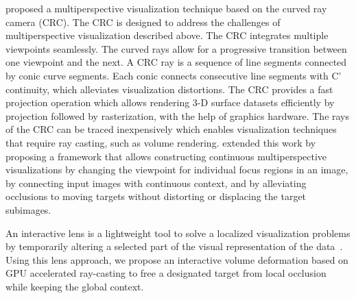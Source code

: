 \cite{5613463} proposed a multiperspective visualization technique
based on the curved ray camera (CRC). The CRC is designed to
address the challenges of multiperspective visualization described
above. The CRC integrates multiple viewpoints seamlessly. The
curved rays allow for a progressive transition between one viewpoint
and the next. A CRC ray is a sequence of line segments connected by
conic curve segments. Each conic connects consecutive line
segments with C'
 continuity, which alleviates visualization
distortions. The CRC provides a fast projection operation which
allows rendering 3-D surface datasets efficiently by projection
followed by rasterization, with the help of graphics hardware. The
rays of the CRC can be traced inexpensively which enables
visualization techniques that require ray casting, such as volume
rendering. \newline
\cite{7120994} extended this work by proposing a framework that allows constructing continuous multiperspective visualizations
by changing the viewpoint for individual focus regions
in an image, by connecting input images with continuous
context, and by alleviating occlusions to moving targets
without distorting or displacing the target subimages.

An interactive lens is a lightweight tool to solve a localized visualization problems by temporarily altering a selected part of the visual representation of the data~\cite{CGF:CGF12871}. Using this lens approach, we propose an interactive volume deformation based on GPU accelerated ray-casting to free a designated target from local occlusion while keeping the global context.

